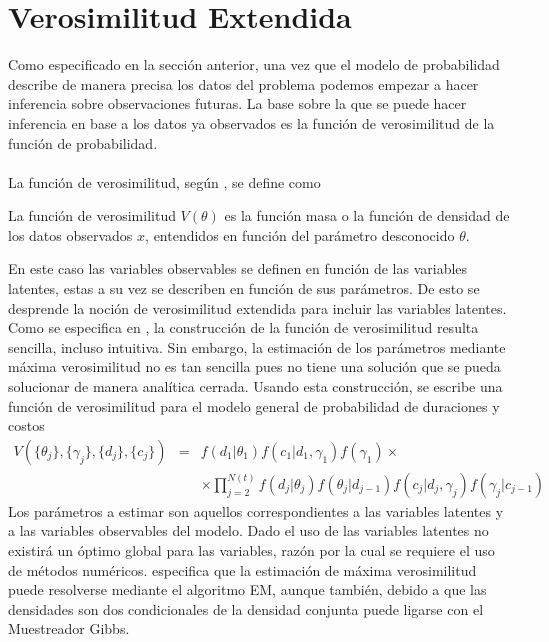 \section{Verosimilitud Extendida}
Como especificado en la secci\'on anterior, una vez que el modelo de probabilidad describe de manera precisa los datos del problema podemos empezar a hacer inferencia sobre observaciones futuras. La base sobre la que se puede hacer inferencia en base a los datos ya observados es la funci\'on de verosimilitud de la funci\'on de probabilidad.\\
\\
La funci\'on de verosimilitud, seg\'un \cite{held2014applied}, se define como
\begin{defi}
La funci\'on de verosimilitud $V(\theta)$ es la funci\'on masa o la funci\'on de densidad de los datos observados $x$, entendidos en funci\'on del par\'ametro desconocido $\theta$.
\end{defi}
En este caso las variables observables se definen en funci\'on de las variables latentes, estas a su vez se describen en funci\'on de sus par\'ametros. De esto se desprende la noci\'on de verosimilitud extendida para incluir las variables latentes. Como se especifica en \cite{pitt2002constructing}, la construcci\'on de la funci\'on de verosimilitud resulta sencilla, incluso intuitiva. Sin embargo, la estimaci\'on de los par\'ametros mediante m\'axima verosimilitud no es tan sencilla pues no tiene una soluci\'on que se pueda solucionar de manera anal\'itica cerrada. Usando esta construcci\'on, se escribe una funci\'on de verosimilitud para el modelo general de probabilidad de duraciones y costos\\
\begin{eqnarray}
V(\{\theta_j\},\{\gamma_j\},\{d_j\},\{c_j\}) &=& f(d_1|\theta_1)f(c_1|d_1,\gamma_1)f(\gamma_1) \times\nonumber\\
&& \times \prod_{j=2}^{N(t)} f(d_j|\theta_j)f(\theta_j|d_{j-1})f(c_j|d_j,\gamma_j)f(\gamma_j|c_{j-1})\nonumber
\end{eqnarray}
Los par\'ametros a estimar son aquellos correspondientes a las variables latentes y a las variables observables del modelo. Dado el uso de las variables latentes no existir\'a un \'optimo global para las variables, raz\'on por la cual se requiere el uso de m\'etodos num\'ericos. \cite{pitt2002constructing} especifica que la estimaci\'on de m\'axima verosimilitud puede resolverse mediante el algoritmo EM, aunque tambi\'en, debido a que las densidades son dos condicionales de la densidad conjunta puede ligarse con el Muestreador Gibbs.\\
